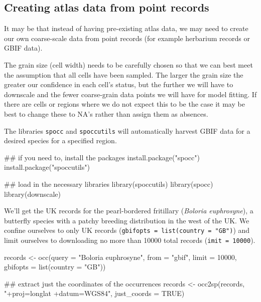 \documentclass{article}[12pt, a4paper]
\begin{document}
\newpage
\subsection{Creating atlas data from point records}

It may be that instead of having pre-existing atlas data, we may need to create our own coarse-scale data from point records (for example herbarium records or GBIF data).

The grain size (cell width) needs to be carefully chosen so that we can best meet the assumption that all cells have been sampled. The larger the grain size the greater our confidence in each cell's status, but the further we will have to downscale and the fewer coarse-grain data points we will have for model fitting. If there are cells or regions where we do not expect this to be the case it may be best to change these to NA’s rather than assign them as absences.

The libraries \texttt{spocc} and \texttt{spoccutils} will automatically harvest GBIF data for a desired species for a specified region.

\begin{Schunk}
\begin{Sinput}
## if you need to, install the packages
install.package("spocc")
install.package("spoccutils")

## load in the necessary libraries
library(spoccutils)
library(spocc)
library(downscale)
\end{Sinput}
\end{Schunk}

We’ll get the UK records for the 
pearl-bordered fritillary (\emph{Boloria euphrosyne}), a butterfly species with a patchy breeding distribution in the west of the UK. We confine ourselves to only UK records (\texttt{gbifopts = list(country = "GB")}) and limit ourselves to downloading no more than 10000 total records (\texttt{imit = 10000}).

\begin{Schunk}
\begin{Sinput}
records <- occ(query = "Boloria euphrosyne",
               from = "gbif",
               limit = 10000,
               gbifopts = list(country = "GB"))
               
## extract just the coordinates of the occurrences
records <- occ2sp(records,
                  "+proj=longlat +datum=WGS84",
                  just_coords = TRUE)
\end{Sinput}
\end{Schunk}
\end{document}
